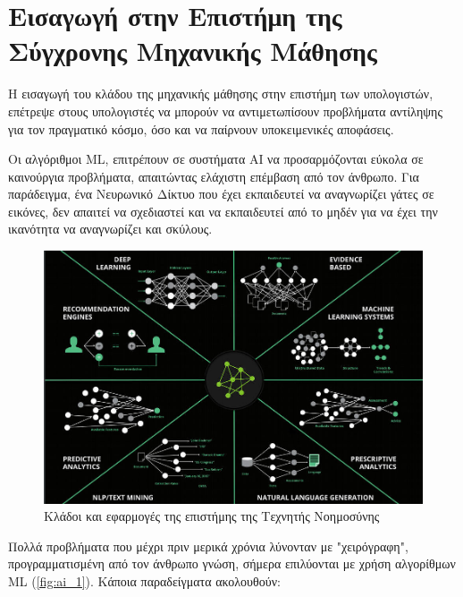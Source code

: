 \section{Εισαγωγή στην Επιστήμη της Σύγχρονης Μηχανικής Μάθησης}
\label{sec:theory_ml}

Η εισαγωγή του κλάδου της μηχανικής μάθησης στην επιστήμη των υπολογιστών,
επέτρεψε στους υπολογιστές να μπορούν να αντιμετωπίσουν προβλήματα αντίληψης
για τον πραγματικό κόσμο, όσο και να παίρνουν υποκειμενικές αποφάσεις.

Οι αλγόριθμοι ML, επιτρέπουν σε συστήματα AI
να προσαρμόζονται εύκολα σε καινούργια προβλήματα, απαιτώντας ελάχιστη επέμβαση από τον άνθρωπο.
Για παράδειγμα, ένα Νευρωνικό Δίκτυο που έχει εκπαιδευτεί να αναγνωρίζει γάτες σε εικόνες,
δεν απαιτεί να σχεδιαστεί και να εκπαιδευτεί από το μηδέν για να έχει την ικανότητα
να αναγνωρίζει και σκύλους.

\begin{figure}[!ht]
  \centering
  \includegraphics[width=1\textwidth]{./images/chapter3/AI_1.jpg}
  \caption[Κλάδοι και εφαρμογές της επιστήμης της Τεχνητής Νοημοσύνης]{Κλάδοι και εφαρμογές της επιστήμης της Τεχνητής Νοημοσύνης}
  \label{fig:ai_1}
\end{figure}

Πολλά προβλήματα που μέχρι πριν μερικά χρόνια λύνονταν με
"χειρόγραφη", προγραμματισμένη από τον άνθρωπο γνώση, σήμερα επιλύονται με χρήση
αλγορίθμων ML (\autoref{fig:ai_1}). Κάποια παραδείγματα ακολουθούν:

